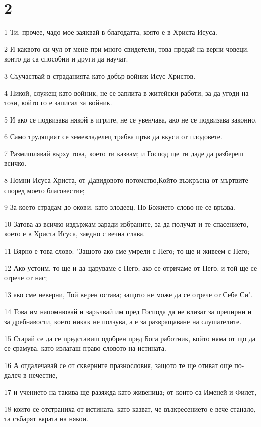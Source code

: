 \chapter{2}

\par 1 Ти, прочее, чадо мое заяквай в благодатта, която е в Христа Исуса.
\par 2 И каквото си чул от мене при много свидетели, това предай на верни човеци, които да са способни и други да научат.
\par 3 Съучаствай в страданията като добър войник Исус Христов.
\par 4 Никой, служещ като войник, не се заплита в житейски работи, за да угоди на този, който го е записал за войник.
\par 5 И ако се подвизава някой в игрите, не се увенчава, ако не се подвизава законно.
\par 6 Само трудящият се земевладелец трябва пръв да вкуси от плодовете.
\par 7 Размишлявай върху това, което ти казвам; и Господ ще ти даде да разбереш всичко.
\par 8 Помни Исуса Христа, от Давидовото потомство,Който възкръсна от мъртвите според моето благовестие;
\par 9 За което страдам до окови, като злодеец. Но Божието слово не се връзва.
\par 10 Затова аз всичко издържам заради избраните, за да получат и те спасението, което е в Христа Исуса, заедно с вечна слава.
\par 11 Вярно е това слово: "Защото ако сме умрели с Него; то ще и живеем с Него;
\par 12 Ако устоим, то ще и да царуваме с Него; ако се отричаме от Него, и той ще се отрече от нас;
\par 13 ако сме неверни, Той верен остава; защото не може да се отрече от Себе Си".
\par 14 Това им напомнювай и заръчвай им пред Господа да не влизат за препирни и за дребнавости, което никак не ползува, а е за развращаване на слушателите.
\par 15 Старай се да се представиш одобрен пред Бога работник, който няма от що да се срамува, като излагаш право словото на истината.
\par 16 А отдалечавай се от скверните празнословия, защото те ще отиват още по-далеч в нечестие,
\par 17 и учението на такива ще разяжда като живеница; от които са Именей и Филет,
\par 18 които се отстраниха от истината, като казват, че възкресението е вече станало, та събарят вярата на някои.
